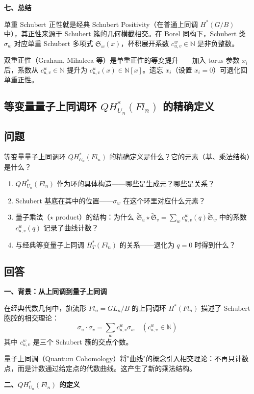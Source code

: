 \textbf{七、总结}

单重 Schubert 正性就是经典 Schubert Positivity（在普通上同调 $H^*(G/B)$ 中），其正性来源于 Schubert 簇的几何横截相交。在 Borel 同构下，Schubert 类 $\sigma_w$ 对应单重 Schubert 多项式 $\mathfrak{S}_w(x)$，杯积展开系数 $c_{u,v}^w \in \mathbb{N}$ 是非负整数。

双重正性（Graham, Mihalcea 等）是单重正性的等变提升——加入 torus 参数 $x_i$ 后，系数从 $c_{u,v}^w \in \mathbb{N}$ 提升为 $c_{u,v}^w(x) \in \mathbb{N}[x]$。遗忘 $x_i$（设置 $x_i = 0$）可退化回单重正性。

\subsection{等变量量子上同调环 $QH_{U_n}^*(Fl_n)$ 的精确定义}\label{sec:qa-QH-Un-Fln}
\subsection{问题}
等变量量子上同调环 $QH_{U_n}^*(Fl_n)$ 的精确定义是什么？它的元素（基、乘法结构）是什么？
\begin{enumerate}
\item $QH_{U_n}^*(Fl_n)$ 作为环的具体构造——哪些是生成元？哪些是关系？
\item Schubert 基底在其中的位置——$\sigma_w$ 在这个环里对应什么元素？
\item 量子乘法（$\star$ product）的结构：为什么 $\widetilde{\mathfrak{S}}_u \star \widetilde{\mathfrak{S}}_v = \sum_w c_{u,v}^w(q) \widetilde{\mathfrak{S}}_w$ 中的系数 $c_{u,v}^w(q)$ 记录了曲线计数？
\item 与经典等变量子上同调 $H_T^*(Fl_n)$ 的关系——退化为 $q = 0$ 时得到什么？
\end{enumerate}

\subsection{回答}

\textbf{一、背景：从上同调到量子上同调}

在经典代数几何中，旗流形 $Fl_n = GL_n/B$ 的上同调环 $H^*(Fl_n)$ 描述了 Schubert 胞腔的相交理论：
$$\sigma_u \cdot \sigma_v = \sum_w c_{u,v}^w \sigma_w \quad (c_{u,v}^w \in \mathbb{N})$$
其中 $c_{u,v}^w$ 是三个 Schubert 簇的交点个数。

量子上同调（Quantum Cohomology）将"曲线"的概念引入相交理论：不再只计数点，而是计数通过给定点的代数曲线。这产生了新的乘法结构。

\textbf{二、$QH_{U_n}^*(Fl_n)$ 的定义}

